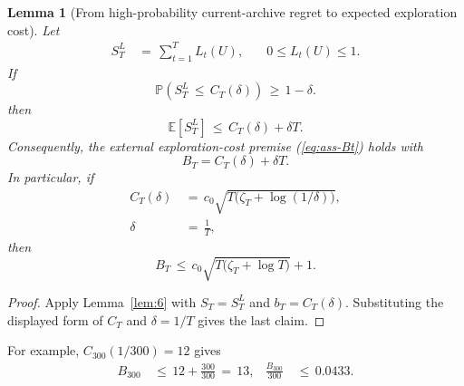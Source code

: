 \documentclass{article} %
\newtheorem{lemma}[theorem]{Lemma}
\renewcommand{\eqref}[1]{\textup{(\ref{#1})}}
\begin{document}
\begin{lemma}[From high-probability current-archive regret to expected exploration cost]
\label{lem:16}
Let
\begin{equation}
\label{eq:app-six-ST-def}
\begin{aligned}
S_T^L
&\,=\,
\sum_{t=1}^{T}L_t(U),
&
\quad 0\leq L_t(U)\leq1.
\end{aligned}
\end{equation}
If
\begin{equation}
\label{eq:app-six-hp-event}
\mathbb{P}\!\left(S_T^L\,\le\, C_T(\delta)\right)\,\ge\, 1-\delta.
\end{equation}
then
\begin{equation}
\label{eq:app-six-expected-bridge}
\mathbb{E}[S_T^L]
\,\le\,
C_T(\delta)+\delta T.
\end{equation}
Consequently, the external exploration-cost premise
\eqref{eq:ass-Bt} holds with
\begin{equation}
\label{eq:app-six-BT-from-CT}
B_T
=
C_T(\delta)+\delta T.
\end{equation}
In particular, if
\begin{align}
\label{eq:app-six-generic-CT}
C_T(\delta)
&\,=\,
c_0\sqrt{T\bigl(\zeta_T+\log(1/\delta)\bigr)},
\\
\label{eq:app-six-delta-choice}
\delta
&\,=\,
\frac{1}{T},
\end{align}
then
\begin{equation}
\label{eq:app-six-generic-BT}
B_T
\,\le\,
c_0\sqrt{T\bigl(\zeta_T+\log T\bigr)}+1.
\end{equation}
\end{lemma}

\begin{proof}
Apply Lemma~\ref{lem:6} with \(S_T=S_T^L\) and
\(b_T=C_T(\delta)\). Substituting the displayed form of \(C_T\) and
\(\delta=1/T\) gives the last claim.
\end{proof}

For example, \(C_{300}(1/300)=12\) gives
\begin{equation}
\begin{aligned}
B_{300}
&\,\le\,
12+\frac{300}{300}
\,=\,13,
&
\frac{B_{300}}{300}
&\,\le\,
0.0433.
\end{aligned}
\end{equation}
\end{document}
